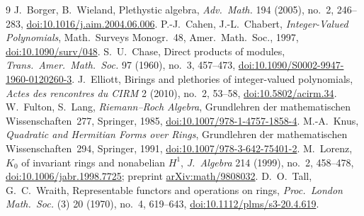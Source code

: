 \documentclass[11pt,a4paper]{amsart}
\theoremstyle{definition}
\theoremstyle{remark}
\begin{document}
\begin{thebibliography}{9}
 J.~Borger, B.~Wieland, Plethystic algebra, \emph{Adv.\ Math.} 194 (2005), no.~2, 246--283, \href{https://doi.org/10.1016/j.aim.2004.06.006}{doi:10.1016/j.aim.2004.06.006}.
 P.-J.~Cahen, J.-L.~Chabert, \emph{Integer-Valued Polynomials}, Math.\ Surveys Monogr.~48, Amer.\ Math.\ Soc., 1997, \href{https://doi.org/10.1090/surv/048}{doi:10.1090/surv/048}.
 S.~U.~Chase, Direct products of modules, \emph{Trans.\ Amer.\ Math.\ Soc.} 97 (1960), no.~3, 457--473, \href{https://doi.org/10.1090/S0002-9947-1960-0120260-3}{doi:10.1090/S0002-9947-1960-0120260-3}.
 J.~Elliott, Birings and plethories of integer-valued polynomials, \emph{Actes des rencontres du CIRM} 2 (2010), no.~2, 53--58, \href{https://doi.org/10.5802/acirm.34}{doi:10.5802/acirm.34}.
 W.~Fulton, S.~Lang, \emph{Riemann--Roch Algebra}, Grundlehren der mathematischen Wissenschaften~277, Springer, 1985, \href{https://doi.org/10.1007/978-1-4757-1858-4}{doi:10.1007/978-1-4757-1858-4}.
 M.-A.~Knus, \emph{Quadratic and Hermitian Forms over Rings}, Grundlehren der mathematischen Wissenschaften~294, Springer, 1991, \href{https://doi.org/10.1007/978-3-642-75401-2}{doi:10.1007/978-3-642-75401-2}.
 M.~Lorenz, $K_0$ of invariant rings and nonabelian $H^1$, \emph{J.\ Algebra} 214 (1999), no.~2, 458--478, \href{https://doi.org/10.1006/jabr.1998.7725}{doi:10.1006/jabr.1998.7725}; preprint \href{https://arxiv.org/abs/math/9808032}{arXiv:math/9808032}.
 D.~O.~Tall, G.~C.~Wraith, Representable functors and operations on rings, \emph{Proc.\ London Math.\ Soc.} (3) 20 (1970), no.~4, 619--643, \href{https://doi.org/10.1112/plms/s3-20.4.619}{doi:10.1112/plms/s3-20.4.619}.
\end{thebibliography}
\end{document}
